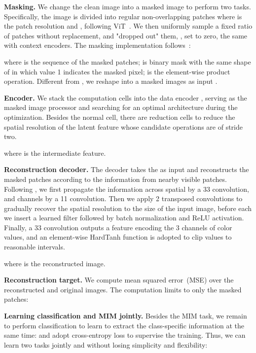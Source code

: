 \documentclass[10pt,twocolumn,letterpaper]{article}
\newcommand{\mypara}[1]{\vspace{1mm}\noindent\textbf{#1}}
\begin{document}
\mypara{Masking.}
We change the clean image into a masked image to perform two tasks.
Specifically, the image  is divided into regular non-overlapping patches  where  is the patch resolution and 
, following ViT~\cite{dosovitskiy2021vit}.
We then uniformly sample a fixed ratio of patches without replacement, and "dropped out" them, \ie, set to zero, the same with context encoders\cite{Pathak_2016_Inpainting}.
The masking implementation follows~\cite{He_2022_mae}:

where  is the sequence of the masked patches;  is binary mask with the same shape of  in which value 1 indicates the masked pixel;  is the element-wise product operation.
Different from \cite{He_2022_mae}, we reshape  into a masked images as input .

\mypara{Encoder.}
We stack the computation cells into the data encoder , serving as the masked image processor and searching for an optimal architecture during the optimization.
Besides the normal cell, there are reduction cells to reduce the spatial resolution of the latent feature whose candidate operations are of stride two.
\vspace{-4pt}

where  is the intermediate feature.

\mypara{Reconstruction decoder.}
The decoder  takes the  as input and reconstructs the masked patches according to the information from nearby visible patches.
Following \cite{Pathak_2016_Inpainting}, we first propagate the information across spatial by a 33 convolution, and channels by a 11 convolution.
Then we apply 2 transposed convolutions to gradually recover the spatial resolution to the size of the input image, before each we insert a learned filter followed by batch normalization and ReLU activation.
Finally, a 33 convolution outputs a feature encoding the 3 channels of color values, and an element-wise HardTanh function is adopted to clip values to reasonable intervals.
\vspace{-4pt}

where  is the reconstructed image.

\mypara{Reconstruction target.}
We compute mean squared error~(MSE) over the reconstructed and original images. The computation limits to only the masked patches:
\vspace{-4pt}


\mypara{Learning classification and MIM jointly.}
Besides the MIM task, we remain to perform classification to learn to extract the class-specific information at the same time:
 and adopt cross-entropy loss  to supervise the training. Thus, we can learn two tasks jointly and without losing simplicity and flexibility:
\vspace{-4pt}
\end{document}
